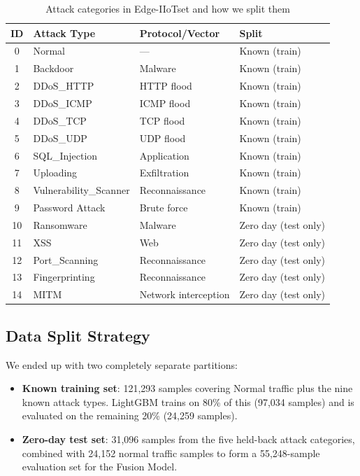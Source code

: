 \documentclass[12pt,a4paper]{report}
\begin{document}
\begin{table}[H]
\centering
\caption{Attack categories in Edge-IIoTset and how we split them}
\label{tab:attack_categories}
\begin{tabular}{clll}
\toprule
\textbf{ID} & \textbf{Attack Type} & \textbf{Protocol/Vector} & \textbf{Split} \\
\midrule
0  & Normal              & ---                  & Known (train) \\
1  & Backdoor            & Malware              & Known (train) \\
2  & DDoS\_HTTP          & HTTP flood           & Known (train) \\
3  & DDoS\_ICMP          & ICMP flood           & Known (train) \\
4  & DDoS\_TCP           & TCP flood            & Known (train) \\
5  & DDoS\_UDP           & UDP flood            & Known (train) \\
6  & SQL\_Injection       & Application          & Known (train) \\
7  & Uploading           & Exfiltration         & Known (train) \\
8  & Vulnerability\_Scanner & Reconnaissance   & Known (train) \\
9  & Password Attack      & Brute force         & Known (train) \\
\midrule
10 & Ransomware          & Malware              & Zero day (test only) \\
11 & XSS                 & Web                  & Zero day (test only) \\
12 & Port\_Scanning       & Reconnaissance      & Zero day (test only) \\
13 & Fingerprinting      & Reconnaissance       & Zero day (test only) \\
14 & MITM                & Network interception & Zero day (test only) \\
\bottomrule
\end{tabular}
\end{table}

\subsection{Data Split Strategy}

We ended up with two completely separate partitions:

\begin{itemize}
  \item \textbf{Known training set}: 121,293 samples covering Normal traffic
        plus the nine known attack types. LightGBM trains on 80\% of this
        (97,034 samples) and is evaluated on the remaining 20\% (24,259 samples).
  \item \textbf{Zero-day test set}: 31,096 samples from the five held-back
        attack categories, combined with 24,152 normal traffic samples to form
        a 55,248-sample evaluation set for the Fusion Model.
\end{itemize}
\end{document}
